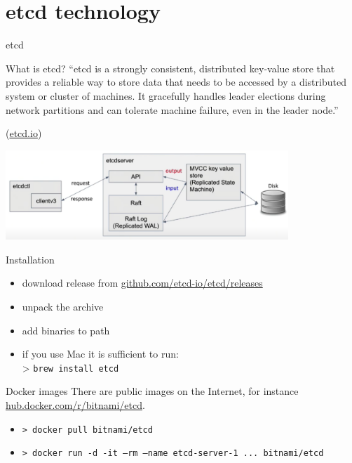 \documentclass[presentation]{beamer}\mode<presentation>{\usetheme{AMSBolognaFC}}
\begin{document}
\section{etcd technology}

\begin{frame}[allowframebreaks]{etcd}
	\begin{block}{What is etcd?}
		``etcd is a strongly consistent, \alert{distributed key-value store} that provides a reliable way to store data that needs to be accessed by a distributed system or cluster of machines.
        It gracefully handles leader elections during network partitions and can tolerate machine failure, even in the leader node.''
        \begin{flushright}
            (\href{https://etcd.io/}{etcd.io})
        \end{flushright}
	\end{block}
    
    \centering
    \includegraphics[width=0.8\textwidth]{figures/etcd.png}
    
    \framebreak
    
    \begin{block}{Installation}
        \begin{itemize}
            \item download release from \alert{\href{https://github.com/etcd-io/etcd/releases/}{github.com/etcd-io/etcd/releases}}
            \item unpack the archive
            \item add binaries to path
            \item if you use Mac it is sufficient to run:\\
            > \texttt{brew install etcd}
        \end{itemize}
    \end{block}
    
    \begin{block}{Docker images}
        There are public images on the Internet, for instance \alert{\href{https://hub.docker.com/r/bitnami/etcd/}{hub.docker.com/r/bitnami/etcd}}.
        \begin{itemize}
            \item \texttt{> docker pull bitnami/etcd}
            \item \texttt{> docker run -d -it --rm --name etcd-server-1 ... bitnami/etcd}
        \end{itemize}
    \end{block}


\end{frame}
\end{document}
